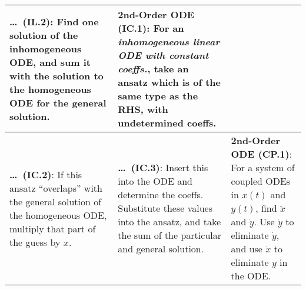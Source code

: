 \begin{tabular}{|m{.31\linewidth}|m{.31\linewidth}|m{.31\linewidth}|}
\textbf{\ldots\ (IL.2)}:
    Find one solution of the inhomogeneous ODE, and sum it with the solution to
    the homogeneous ODE for the general solution. &

\textbf{2nd-Order ODE (IC.1)}:
    For an \emph{inhomogeneous linear ODE with constant coeffs.}, take an ansatz
    which is of the same type as the RHS, with undetermined coeffs. \\

\hline

\textbf{\ldots\ (IC.2)}:
    If this ansatz ``overlaps'' with the general solution of the homogeneous
    ODE, multiply that part of the guess by $ x $. &

\textbf{\ldots\ (IC.3)}:
    Insert this into the ODE and determine the coeffs. Substitute these values
    into the ansatz, and take the sum of the particular and general solution. &

\textbf{2nd-Order ODE (CP.1)}:
    For a system of coupled ODEs in $ x(t) $ and $ y(t) $, find $ \ddot{x} $ and
    $ \dot{y} $. Use $ \dot{y} $ to eliminate $ \dot{y} $, and use $ \dot{x} $
    to eliminate $ y $ in the ODE. \\

\hline
\end{tabular}
\clearpage

%
%

